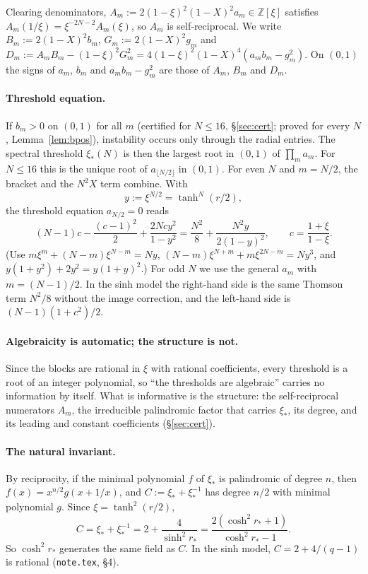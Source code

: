 \documentclass[11pt]{article}
\theoremstyle{remark}
\begin{document}
Clearing denominators, $A_m:=2(1-\xi)^2(1-X)^2a_m\in\mathbb Z[\xi]$ satisfies
$A_m(1/\xi)=\xi^{-2N-2}A_m(\xi)$, so $A_m$ is self-reciprocal. We write
$B_m:=2(1-X)^2b_m$, $G_m:=2(1-X)^2g_m$ and $D_m:=A_mB_m-(1-\xi)^2G_m^2=4(1-\xi)^2(1-X)^4(a_mb_m-g_m^2)$.
On $(0,1)$ the signs of $a_m$, $b_m$ and $a_mb_m-g_m^2$ are those of $A_m$, $B_m$ and $D_m$.

\paragraph{Threshold equation.} If $b_m>0$ on $(0,1)$ for all $m$ (certified for $N\le16$, \S\ref{sec:cert}; proved for
every $N$, Lemma~\ref{lem:bpos}), instability
occurs only through the radial entries. The spectral threshold $\xi_*(N)$ is then the largest root in $(0,1)$ of
$\prod_m a_m$. For $N\le16$ this is the unique root of $a_{\lfloor N/2\rfloor}$ in $(0,1)$. For even $N$ and $m=N/2$, the bracket
and the $N^2X$ term combine. With
\[
y:=\xi^{N/2}=\tanh^N(r/2),
\]
the threshold equation $a_{N/2}=0$ reads
\begin{equation}\label{eq:even}
(N-1)c-\frac{(c-1)^2}2+\frac{2Ncy^2}{1-y^2}=\frac{N^2}8+\frac{N^2y}{2(1-y)^2},\qquad c=\frac{1+\xi}{1-\xi}.
\end{equation}
(Use $m\xi^m+(N-m)\xi^{N-m}=Ny$, $(N-m)\xi^{N+m}+m\xi^{2N-m}=Ny^3$, and $y(1+y^2)+2y^2=y(1+y)^2$.) For odd $N$ we use the
general $a_m$ with $m=(N-1)/2$. In the sinh model the right-hand side is the same Thomson term $N^2/8$ without the
image correction, and the left-hand side is $(N-1)(1+c^2)/2$.

\paragraph{Algebraicity is automatic; the structure is not.} Since the blocks are rational in $\xi$ with rational
coefficients, every threshold is a root of an integer polynomial, so ``the thresholds are algebraic'' carries no
information by itself. What is informative is the structure: the self-reciprocal numerators $A_m$, the irreducible
palindromic factor that carries $\xi_*$, its degree, and its leading and constant coefficients (\S\ref{sec:cert}).

\paragraph{The natural invariant.} By reciprocity, if the minimal polynomial $f$ of $\xi_*$ is palindromic of degree $n$,
then $f(x)=x^{n/2}g(x+1/x)$, and $C:=\xi_*+\xi_*^{-1}$ has degree $n/2$ with minimal polynomial $g$. Since $\xi=\tanh^2(r/2)$,
\[
C=\xi_*+\xi_*^{-1}=2+\frac4{\sinh^2r_*}=\frac{2(\cosh^2r_*+1)}{\cosh^2r_*-1}.
\]
So $\cosh^2r_*$ generates the same field as $C$. In the sinh model, $C=2+4/(q-1)$ is rational (\texttt{note.tex}, \S4).
\end{document}
